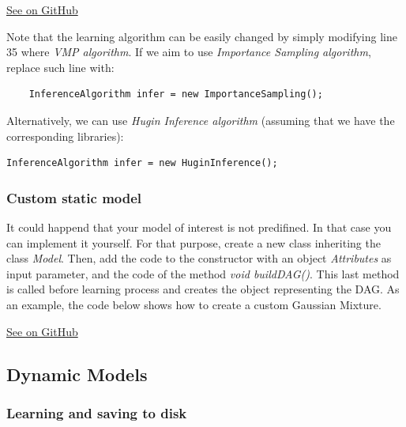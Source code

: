 \documentclass[10pt,a4paper]{article}
\begin{document}
\href{https://github.com/amidst/tutorial/blob/master/src/main/java/eu/amidst/tutorial/usingAmidst/examples/StaticModelInference.java}{See on GitHub}

Note that the learning algorithm can be easily changed by simply modifying line 35 where \textit{VMP algorithm}. If we aim to use \textit{Importance Sampling algorithm}, replace such line with:

\begin{verbatim}
	InferenceAlgorithm infer = new ImportanceSampling();
\end{verbatim}  

Alternatively, we can use \textit{Hugin Inference algorithm} (assuming that we have the corresponding libraries):

\begin{verbatim}
InferenceAlgorithm infer = new HuginInference();
\end{verbatim}  



\subsubsection{Custom static model}\label{sec:lvmodels:static:custom}

It could happend that your model of interest is not predifined. In that case you can implement it yourself. For that purpose, create a new class inheriting the class \textit{Model}. Then, add the code to the constructor with an object \textit{Attributes} as input parameter, and the code of the method \textit{void buildDAG()}. This last method is called before learning process and creates the object representing the DAG. As an example, the code below shows how to create a custom Gaussian Mixture.


\href{https://github.com/amidst/tutorial/blob/master/src/main/java/eu/amidst/tutorial/usingAmidst/practice/CustomGaussianMixture.java}{See on GitHub}


\subsection{Dynamic Models}\label{sec:lvmodels:dynamic}
\subsubsection{ Learning and saving to disk }\label{sec:lvmodels:dynamic:learning}
\end{document}
